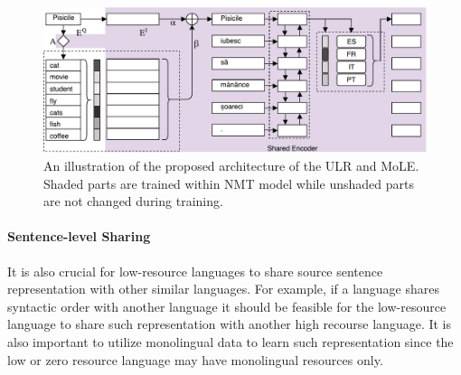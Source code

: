\begin{figure}[t]
	\centering
	\includegraphics[width=0.98\linewidth]{figs/ulr/model2x}\vspace{-15pt}
      \caption{\label{fig.model} An illustration of the proposed architecture of the ULR and MoLE. Shaded parts are trained within NMT model while unshaded parts are not changed during  training.}\vspace{-8pt}
\end{figure}




\paragraph{Sentence-level Sharing} It is also crucial for low-resource languages to share source sentence representation with other similar languages. For example, if a language shares  syntactic order with another language it should be feasible for the low-resource language to share such representation with another high recourse language. It is also important to utilize monolingual data to learn such representation since the low or zero resource language may  have monolingual resources only.




